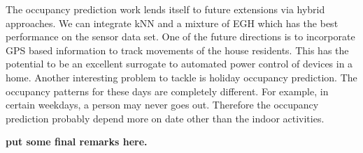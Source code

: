 The occupancy prediction work lends itself to future extensions via hybrid approaches. We can integrate kNN and a mixture of EGH which has the best performance on the sensor data set. One of the future directions is to incorporate GPS based information to track movements of the house residents. This has the potential to be an excellent surrogate to automated power control of devices in a home. Another interesting problem to tackle is holiday occupancy prediction. The occupancy patterns for these days are completely different. For example, in certain weekdays, a person may never goes out. Therefore the occupancy prediction probably depend more on date other than the indoor activities. 

\textbf{put some final remarks here.}
